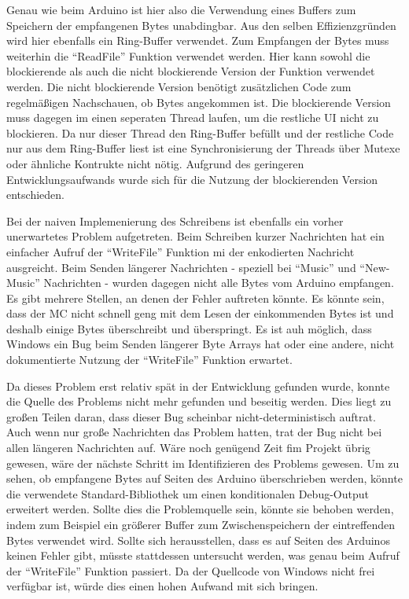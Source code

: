 Genau wie beim Arduino ist hier also die Verwendung eines Buffers zum Speichern der empfangenen Bytes unabdingbar.
Aus den selben Effizienzgründen wird hier ebenfalls ein Ring-Buffer verwendet.
Zum Empfangen der Bytes muss weiterhin die \enquote{ReadFile} Funktion verwendet werden.
Hier kann sowohl die blockierende als auch die nicht blockierende Version der Funktion verwendet werden.
Die nicht blockierende Version benötigt zusätzlichen Code zum regelmäßigen Nachschauen, ob Bytes angekommen ist.
Die blockierende Version muss dagegen im einen seperaten Thread laufen, um die restliche \ac{UI} nicht zu blockieren.
Da nur dieser Thread den Ring-Buffer befüllt und der restliche Code nur aus dem Ring-Buffer liest ist eine Synchronisierung der Threads über Mutexe oder ähnliche Kontrukte nicht nötig.
Aufgrund des geringeren Entwicklungsaufwands wurde sich für die Nutzung der blockierenden Version entschieden.

Bei der naiven Implemenierung des Schreibens ist ebenfalls ein vorher unerwartetes Problem aufgetreten.
Beim Schreiben kurzer Nachrichten hat ein einfacher Aufruf der \enquote{WriteFile} Funktion mi der enkodierten Nachricht ausgreicht.
Beim Senden längerer Nachrichten - speziell bei \enquote{Music} und \enquote{New-Music} Nachrichten - wurden dagegen nicht alle Bytes vom Arduino empfangen.
Es gibt mehrere Stellen, an denen der Fehler auftreten könnte.
Es könnte sein, dass der \ac{MC} nicht schnell geng mit dem Lesen der einkommenden Bytes ist und deshalb einige Bytes überschreibt und überspringt.
Es ist auh möglich, dass Windows ein Bug beim Senden längerer Byte Arrays hat oder eine andere, nicht dokumentierte Nutzung der \enquote{WriteFile} Funktion erwartet.

Da dieses Problem erst relativ spät in der Entwicklung gefunden wurde, konnte die Quelle des Problems nicht mehr gefunden und beseitig werden.
Dies liegt zu großen Teilen daran, dass dieser Bug scheinbar nicht-deterministisch auftrat.
Auch wenn nur große Nachrichten das Problem hatten, trat der Bug nicht bei allen längeren Nachrichten auf.
Wäre noch genügend Zeit fim Projekt übrig gewesen, wäre der nächste Schritt im Identifizieren des Problems gewesen.
Um zu sehen, ob empfangene Bytes auf Seiten des Arduino überschrieben werden, könnte die verwendete Standard-Bibliothek um einen konditionalen Debug-Output erweitert werden.
Sollte dies die Problemquelle sein, könnte sie behoben werden, indem zum Beispiel ein größerer Buffer zum Zwischenspeichern der eintreffenden Bytes verwendet wird.
Sollte sich herausstellen, dass es auf Seiten des Arduinos keinen Fehler gibt, müsste stattdessen untersucht werden, was genau beim Aufruf der \enquote{WriteFile} Funktion passiert.
Da der Quellcode von Windows nicht frei verfügbar ist, würde dies einen hohen Aufwand mit sich bringen.

